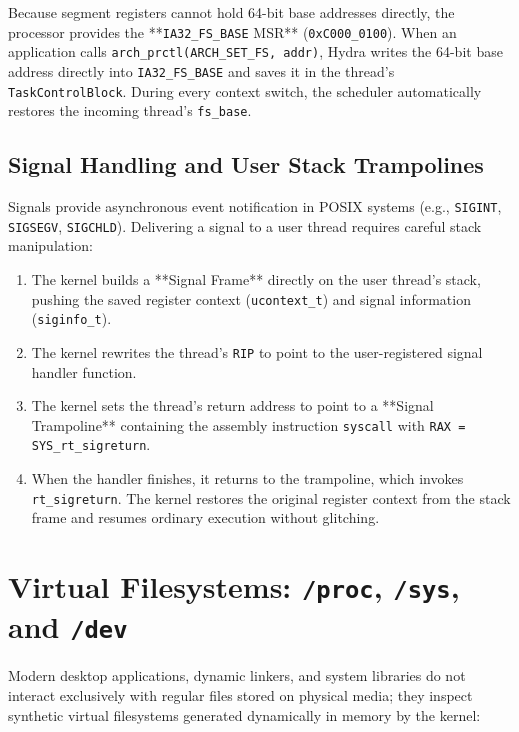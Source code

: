 Because segment registers cannot hold 64-bit base addresses directly, the processor provides the **\texttt{IA32\_FS\_BASE} MSR** (\texttt{0xC000\_0100}). When an application calls \texttt{arch\_prctl(ARCH\_SET\_FS, addr)}, Hydra writes the 64-bit base address directly into \texttt{IA32\_FS\_BASE} and saves it in the thread's \texttt{TaskControlBlock}. During every context switch, the scheduler automatically restores the incoming thread's \texttt{fs\_base}.

\subsection{Signal Handling and User Stack Trampolines}
Signals provide asynchronous event notification in POSIX systems (e.g., \texttt{SIGINT}, \texttt{SIGSEGV}, \texttt{SIGCHLD}). Delivering a signal to a user thread requires careful stack manipulation:
\begin{enumerate}
    \item The kernel builds a **Signal Frame** directly on the user thread's stack, pushing the saved register context (\texttt{ucontext\_t}) and signal information (\texttt{siginfo\_t}).
    \item The kernel rewrites the thread's \texttt{RIP} to point to the user-registered signal handler function.
    \item The kernel sets the thread's return address to point to a **Signal Trampoline** containing the assembly instruction \texttt{syscall} with \texttt{RAX = SYS\_rt\_sigreturn}.
    \item When the handler finishes, it returns to the trampoline, which invokes \texttt{rt\_sigreturn}. The kernel restores the original register context from the stack frame and resumes ordinary execution without glitching.
\end{enumerate}

\section{Virtual Filesystems: \texttt{/proc}, \texttt{/sys}, and \texttt{/dev}}
\label{sec:virtual_filesystems}

Modern desktop applications, dynamic linkers, and system libraries do not interact exclusively with regular files stored on physical media; they inspect synthetic virtual filesystems generated dynamically in memory by the kernel:

